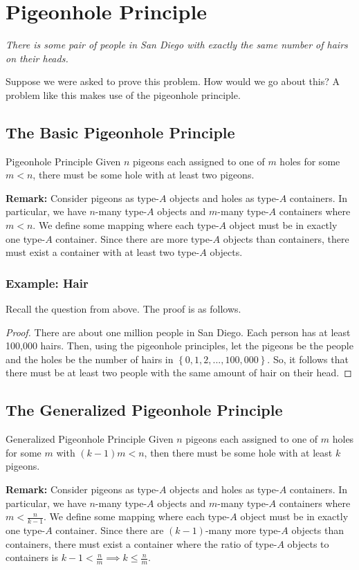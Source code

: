 \documentclass[letterpaper]{article}
\begin{document}
\newpage
\section{Pigeonhole Principle}
\emph{There is some pair of people in San Diego with exactly the same number of hairs on their heads.}

\bigskip 

Suppose we were asked to prove this problem. How would we go about this? A problem like this makes use of the pigeonhole principle. 

\subsection{The Basic Pigeonhole Principle}
\begin{theorem}{Pigeonhole Principle}{}
    Given $n$ pigeons each assigned to one of $m$ holes for some $m < n$, there must be some hole with at least two pigeons. 
\end{theorem}
\textbf{Remark:} Consider pigeons as type-$A$ objects and holes as type-$A$ containers. In particular, we have $n$-many type-$A$ objects and $m$-many type-$A$ containers where $m < n$. We define some mapping where each type-$A$ object must be in exactly one type-$A$ container. Since there are more type-$A$ objects than containers, there must exist a container with at least two type-$A$ objects.

\subsubsection{Example: Hair}
Recall the question from above. The proof is as follows.
\begin{proof}
    There are about one million people in San Diego. Each person has at least 100,000 hairs. Then, using the pigeonhole principles, let the pigeons be the people and the holes be the number of hairs in $\left\{0, 1, 2, ..., 100,000\right\}$. So, it follows that there must be at least two people with the same amount of hair on their head.
\end{proof}


\subsection{The Generalized Pigeonhole Principle}
\begin{theorem}{Generalized Pigeonhole Principle}{}
    Given $n$ pigeons each assigned to one of $m$ holes for some $m$ with $(k - 1)m < n$, then there must be some hole with at least $k$ pigeons. 
\end{theorem}
\textbf{Remark:} Consider pigeons as type-$A$ objects and holes as type-$A$ containers. In particular, we have $n$-many type-$A$ objects and $m$-many type-$A$ containers where $m < \frac{n}{k - 1}$. We define some mapping where each type-$A$ object must be in exactly one type-$A$ container. Since there are $(k - 1)$-many more type-$A$ objects than containers, there must exist a container where the ratio of type-$A$ objects to containers is $k - 1 < \frac{n}{m} \implies k \leq \frac{n}{m}$. 
\end{document}
